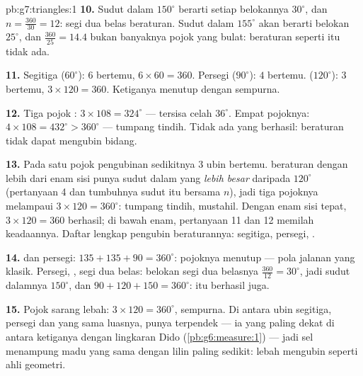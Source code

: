 \begin{solution}{pb:g7:triangles:1}
\textbf{10.} Sudut dalam $150^\circ$ berarti setiap belokannya
$30^\circ$, dan $n = \frac{360}{30} = 12$: segi dua belas beraturan.
Sudut dalam $155^\circ$ akan berarti belokan $25^\circ$, dan
$\frac{360}{25} = 14.4$ bukan banyaknya pojok yang bulat: 
beraturan seperti itu tidak ada.

\textbf{11.} Segitiga ($60^\circ$): $6$ bertemu,
$6 \times 60 = 360$. Persegi ($90^\circ$): $4$ bertemu. 
($120^\circ$): $3$ bertemu, $3 \times 120 = 360$. Ketiganya menutup
dengan sempurna.

\textbf{12.} Tiga pojok : $3 \times 108 = 324^\circ$ ---
tersisa celah $36^\circ$. Empat pojoknya:
$4 \times 108 = 432^\circ > 360^\circ$ --- tumpang tindih. Tidak ada
yang berhasil:  beraturan tidak dapat mengubin bidang.

\textbf{13.} Pada satu pojok pengubinan sedikitnya $3$ ubin bertemu.
 beraturan dengan lebih dari enam sisi punya sudut dalam
yang \emph{lebih besar} daripada $120^\circ$ (pertanyaan 4 dan
tumbuhnya sudut itu bersama $n$), jadi tiga pojoknya melampaui
$3 \times 120 = 360^\circ$: tumpang tindih, mustahil. Dengan enam sisi
tepat, $3 \times 120 = 360$ berhasil; di bawah enam, pertanyaan 11
dan 12 memilah keadaannya. Daftar lengkap pengubin beraturannya:
segitiga, persegi, .

\textbf{14.}  dan persegi:
$135 + 135 + 90 = 360^\circ$: pojoknya menutup --- pola jalanan yang
klasik. Persegi, , segi dua belas: belokan segi dua belasnya
$\frac{360}{12} = 30^\circ$, jadi sudut dalamnya $150^\circ$, dan
$90 + 120 + 150 = 360^\circ$: itu berhasil juga.

\textbf{15.} Pojok sarang lebah: $3 \times 120 = 360^\circ$,
sempurna. Di antara ubin segitiga, persegi dan  yang sama
luasnya,  punya  terpendek --- ia yang paling
dekat di antara ketiganya dengan lingkaran Dido
(\cref{pb:g6:measure:1}) --- jadi sel  menampung madu yang
sama dengan lilin paling sedikit: lebah mengubin seperti ahli geometri.

\end{solution}
